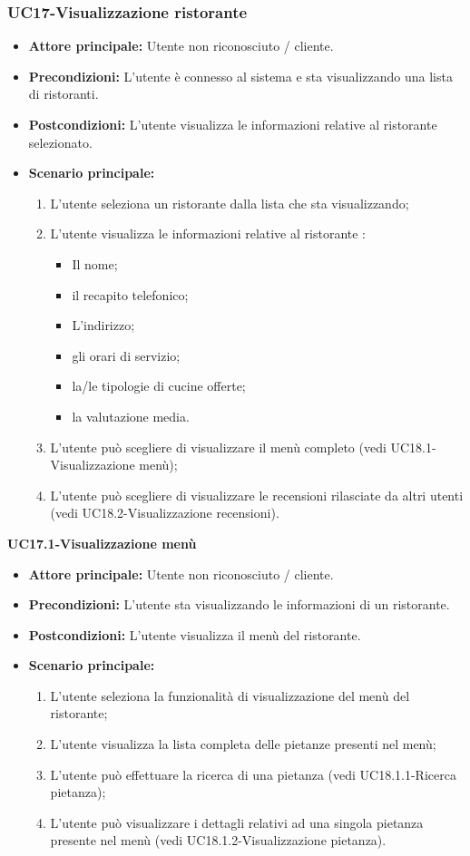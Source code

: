 \subsubsection{UC17-Visualizzazione ristorante}
\begin{itemize}
\item \textbf{Attore principale:} Utente non riconosciuto / cliente.
\item \textbf{Precondizioni:} L'utente è connesso al sistema e sta visualizzando una lista di ristoranti.
\item \textbf{Postcondizioni:} L'utente visualizza le informazioni relative al ristorante selezionato.
\item \textbf{Scenario principale:}
\begin{enumerate}
    \item L'utente seleziona un ristorante dalla lista che sta visualizzando;
    \item L'utente visualizza le informazioni relative al ristorante :
    \begin{itemize}
        \item Il nome;
        \item il recapito telefonico;
        \item L'indirizzo;
        \item gli orari di servizio;
        \item la/le tipologie di cucine offerte;
        \item la valutazione media.
    \end{itemize}
    \item L'utente può scegliere di visualizzare il menù completo (vedi UC18.1-Visualizzazione menù);
    \item L'utente può scegliere di visualizzare le recensioni rilasciate da altri utenti (vedi UC18.2-Visualizzazione recensioni).
\end{enumerate}
\end{itemize}

\textbf{UC17.1-Visualizzazione menù}
\begin{itemize}
\item \textbf{Attore principale:} Utente non riconosciuto / cliente.
\item \textbf{Precondizioni:} L'utente sta visualizzando le informazioni di un ristorante.
\item \textbf{Postcondizioni:} L'utente visualizza il menù del ristorante.
\item \textbf{Scenario principale:}
\begin{enumerate}
    \item L'utente seleziona la funzionalità di visualizzazione del menù del ristorante;
    \item L'utente visualizza la lista completa delle pietanze presenti nel menù;
    \item L'utente può effettuare la ricerca di una pietanza (vedi UC18.1.1-Ricerca pietanza);
    \item L'utente può visualizzare i dettagli relativi ad una singola pietanza presente
     nel menù (vedi UC18.1.2-Visualizzazione pietanza).
\end{enumerate}
\end{itemize}

